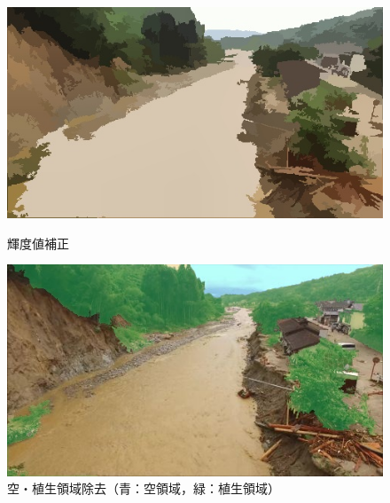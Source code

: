 \documentclass[a4paper, twocolumn, xelatex, 10pt, ja=standard, Ligatures=TeX]{bxjsarticle}
\begin{document}
		\begin{figure}[b]
			\begin{minipage}{0.48\hsize}
				\centering
				\includegraphics[width=\linewidth]{img/contrast.jpg}
				\caption{輝度値補正}
				\label{img03}
			\end{minipage}
			\begin{minipage}{0.48\hsize}
				\centering
				\includegraphics[width=\linewidth]{img/segmentation.jpg}
				\caption{空・植生領域除去（青：空領域，緑：植生領域）}
				\label{img04}
			\end{minipage}
		\end{figure}
\end{document}
